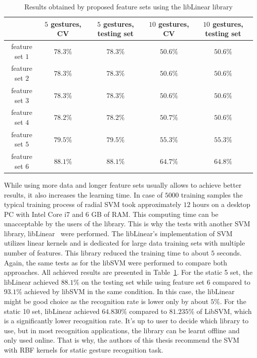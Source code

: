 \begin{table}[htp!]
\begin{center}
	\label{staticfeatlin}
	\caption{Results obtained by proposed feature sets using the libLinear library}
    \begin{tabular}{ccccc}
    \hline
    ~                                                   & $5$ gestures, CV & $5$ gestures, testing set & $10$ gestures, CV  & $10$ gestures, testing set \\ \hline
    feature set $1$                     & $78.3\%$ & $78.3\%$  & $50.6\%$ & $50.6\%$ \\ \hline
    feature set $2$                     & $78.3\%$ & $78.3\%$  & $50.6\%$ & $50.6\%$ \\ \hline
    feature set $3$                     & $78.3\%$ & $78.3\%$  & $50.6\%$ & $50.6\%$ \\ \hline
    feature set $4$                     & $78.2\%$ & $78.2\%$  & $50.7\%$ & $50.6\%$ \\ \hline
    feature set $5$                     & $79.5\%$ & $79.5\%$  & $55.3\%$ & $55.3\%$ \\ \hline
    feature set $6$                     & $88.1\%$ & $88.1\%$  & $64.7\%$ & $64.8\%$ \\ \hline
    \end{tabular}
    \end{center}
\end{table}

While using more data and longer feature sets usually allows to achieve better results, it also increases the learning time. 
In case of $5000$ training samples the typical training process of radial SVM took approximately $12$ hours on a desktop PC with Intel Core i7 and 6 GB of RAM. 
This computing time can be unacceptable by the users of the library. 
This is why the tests with another SVM library, libLinear~\cite{libLinear} were performed. 
The libLinear's implementation of SVM utilizes linear kernels and is dedicated for large data training sets with multiple number of features. 
This library reduced the training time to about $5$ seconds.
Again, the same tests as for the libSVM were performed to compare both approaches.
All achieved results are presented in Table~\ref{staticfeatlin}.
For the static 5 set, the libLinear achieved $88.1\%$ on the testing set while using feature set 6 compared to $93.1\%$ achieved by libSVM in the same condition.
In this case, the libLinear might be good choice as the recognition rate is lower only by about $5\%$.
For the static 10 set, libLinear achieved $64.830\%$ compared to $81.235\%$ of LibSVM, which is a significantly lower recognition rate.
It's up to user to decide which library to use, but in most recognition applications, the library can be learnt offline and only used online.
That is why, the authors of this thesis recommend the SVM with RBF kernels for static gesture recognition task.

